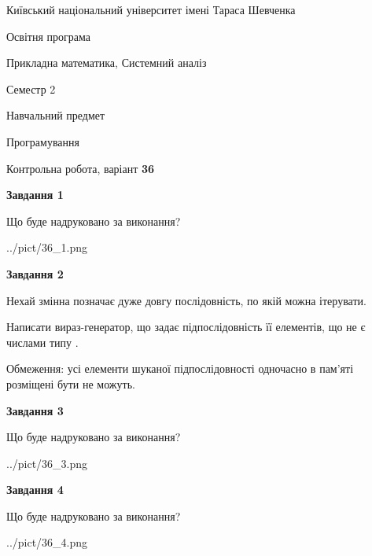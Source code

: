 \documentclass[12pt, ukrainian]{article}
\begin{document}
{{\begin {small}\par
{ \center  Київський національний університет імені Тараса Шевченка \par}
{\parbox {5 cm}{Освітня програма \hfill}{\parbox {8 cm}{Прикладна математика, Системний аналіз \hfill}}\parbox {5 cm}{\hfill Семестр 2}}\par
{\parbox {5 cm} {Навчальний предмет \hfill}\parbox {7 cm}{Програмування \hfill}\parbox {6cm}{\hfill}\par}\vspace{-7pt} \end{small}}{\center Контрольна робота, варіант  \No \textbf
{ 36 }\par}}
{
\begin {large}
{\begin {center}\textbf{Завдання 1}\end {center}}\par
Що буде надруковано за виконання?\par\par
\begin{center}
	{../pict/36_1.png}
\end{center}
\newpage

{\begin {center}\textbf{Завдання 2}\end {center}}\par
Нехай змінна  позначає дуже довгу послідовність, по якій можна ітерувати.

Написати вираз-генератор, що задає підпослідовність її елементів, що не є числами типу .

Обмеження: усі елементи шуканої підпослідовності одночасно в пам'яті розміщені бути не можуть.\par
\newpage

{\begin {center}\textbf{Завдання 3}\end {center}}\par
Що буде надруковано за виконання?
\begin{center}
	{../pict/36_3.png}
\end{center}
\newpage

{\begin {center}\textbf{Завдання 4}\end {center}}\par
Що буде надруковано за виконання?\par
\begin{center}
	{../pict/36_4.png}
\end{center}
\newpage


\end{large}}
\end{document}
